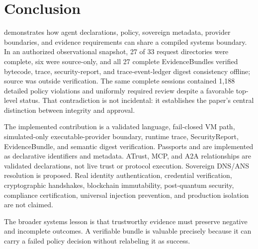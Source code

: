 \section{Conclusion}\label{sec:conclusion}

\Argorix demonstrates how agent declarations, policy, sovereign metadata,
provider boundaries, and evidence requirements can share a compiled systems
boundary.  In an authorized observational snapshot, 27 of 33 request
directories were complete, six were source-only, and all 27 complete
EvidenceBundles verified bytecode, trace, security-report, and
trace-event-ledger digest consistency offline; source was outside verification.
The same complete sessions contained 1,188
detailed policy violations and uniformly required review despite a favorable
top-level status.  That contradiction is not incidental: it establishes the
paper's central distinction between integrity and approval.

The implemented contribution is a validated language, fail-closed VM path,
simulated-only executable-provider boundary, runtime trace, SecurityReport,
EvidenceBundle, and semantic digest verification.  Passports and
 are implemented as declarative identifiers and metadata.
ATrust, MCP, and A2A relationships are validated declarations, not live trust
or protocol execution.  Sovereign DNS/ANS resolution is proposed.  Real
identity authentication, credential verification, cryptographic handshakes,
blockchain immutability, post-quantum security, compliance certification,
universal injection prevention, and production isolation are not claimed.

The broader systems lesson is that trustworthy evidence must preserve negative
and incomplete outcomes.  A verifiable bundle is valuable precisely because it
can carry a failed policy decision without relabeling it as success.
